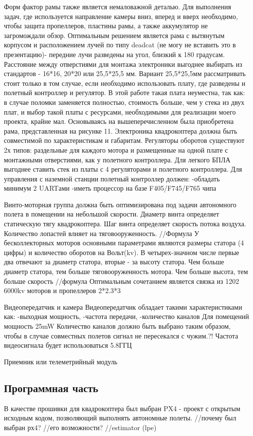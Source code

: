 Форм фактор рамы также является немаловажной деталью. Для выполнения задач, где используется направление камеры вниз, вперед и вверх необходимо, чтобы защита пропеллеров, пластины рамы, а также аккумулятор не загромождали обзор. Оптимальным решением является рама с вытянутым корпусом и расположением лучей по типу deadcat (не могу не вставить это в презентацию)- передние лучи разведены на угол, близкий к 180 градусам. Расстояние между отверстиями для монтажа электроники выгоднее выбирать из стандартов - 16*16, 20*20 или 25,5*25,5 мм. Вариант 25,5*25,5мм рассматривать стоит только в том случае, если необходимо использовать плату, где разведены и полетный контроллер и регулятор. В этой работе такая плата неуместна, так как: в случае поломки заменяется полностью, стоимость больше, чем у стека из двух плат, и выбор такой платы с ресурсами, необходимыми для реализации моего проекта, крайне мал. Основываясь на вышеперечисленном была приобретена рама, представленная на рисунке 11.
Электроника квадрокоптера должна быть совместимой по характеристикам и габаритам. Регуляторы оборотов существуют 2х типов: раздельные для каждого мотора и размещенные на одной плате с монтажными отверстиями, как у полетного контроллера. Для легкого БПЛА выгоднее ставить стек из платы с 4 регуляторами и полетного контроллера.
Для управления с наземной станции полетный контроллер должен:
-обладать минимум 2 UARTами
-иметь процессор на базе F405/F745/F765 чипа

Винто-моторная группа должна быть оптимизирована под задачи автономного полета в помещении на небольшой скорости.
Диаметр винта определяет статическую тягу квадрокоптера.
Шаг винта определяет скорость потока воздуха.
Количество лопастей влияет на тяговооруженность.
//Формула 
У бесколлекторных моторов основными параметрами являются размеры статора (4 цифры) и количество оборотов на Вольт(kv). В четырех-значном числе первые два отвечают за диаметр статора, вторые - за высоту статора. Чем больше диаметр статора, тем больше тяговооруженность мотора. Чем больше высота, тем больше скорость
//формула
Оптимальным сочетанием является связка из 1202 6000kv моторов и пропеллеров 2*2.3*3

Видеопередатчик и камера
Видеопередатчик обладает такими характеристиками как:
-выходная мощность,
-частота передачи,
-количество каналов
Для помещений мощность 25mW
Количество каналов должно быть выбрано таким образом, чтобы в случае совместных полетов сигнал не пересекался с чужим.?!
Частота видеосигнала будет использоваться 5.8ГГЦ

Приемник или телеметрийный модуль


\subsection{Программная часть}
В качестве прошивки для квадрокоптера был выбран PX4 - проект с открытым исходным кодом, позволяющий выполнять автономные полеты.
//почему был выбран рх4?
//его возможности?
//estimator (lpe)
